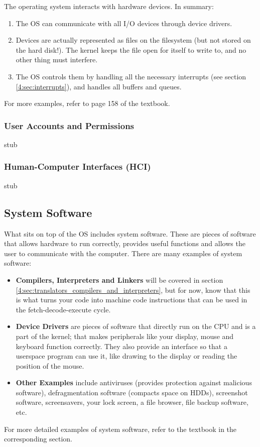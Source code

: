 \documentclass[../main.tex]{subfiles}
\begin{document}
The operating system interacts with hardware devices. In summary:

\begin{enumerate}
    \item The OS can communicate with all I/O devices through device drivers.
    \item Devices are actually represented as files on the filesystem (but not stored on the hard disk!). The kernel keeps the file open for itself to write to, and no other thing must interfere.
    \item The OS controls them by handling all the necessary interrupts (see section \ref{4:sec:interrupts}), and handles all buffers and queues.
\end{enumerate}

For more examples, refer to page 158 of the textbook.

\subsubsection{User Accounts and Permissions}

stub

\subsubsection{Human-Computer Interfaces (HCI)}

stub

\subsection{System Software}

What sits on top of the OS includes system software. These are pieces of software that allows hardware to run correctly, provides useful functions and allows the user to communicate with the computer. There are many examples of system software:

\begin{itemize}
    \item \textbf{Compilers, Interpreters and Linkers} will be covered in section \ref{4:sec:translators_compilers_and_interpreters}, but for now, know that this is what turns your code into machine code instructions that can be used in the fetch-decode-execute cycle.
    \item \textbf{Device Drivers} are pieces of software that directly run on the CPU and is a part of the kernel; that makes peripherals like your display, mouse and keyboard function correctly. They also provide an interface so that a userspace program can use it, like drawing to the display or reading the position of the mouse.
    \item \textbf{Other Examples} include antiviruses (provides protection against malicious software), defragmentation software (compacts space on HDDs), screenshot software, screensavers, your lock screen, a file browser, file backup software, etc.
\end{itemize}

For more detailed examples of system software, refer to the textbook in the corresponding section.
\end{document}
